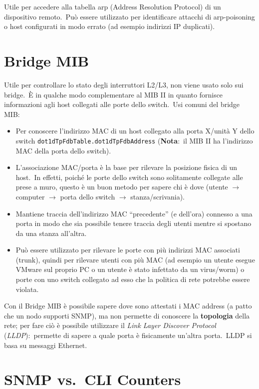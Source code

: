 Utile per accedere alla tabella arp (Address Resolution Protocol) di un dispositivo remoto.\
Può essere utilizzato per identificare attacchi di arp-poisoning o host configurati in modo errato (ad esempio indirizzi IP duplicati).

\section{Bridge MIB}

Utile per controllare lo stato degli interruttori L2/L3, non viene usato solo sui bridge.\
È in qualche modo complementare al MIB II in quanto fornisce informazioni agli host collegati alle porte dello switch.\
Usi comuni del bridge MIB:
\begin{itemize}
    \item Per conoscere l'indirizzo MAC di un host collegato alla porta X/unità Y dello switch \texttt{dot1dTpFdbTable.dot1dTpFdbAddress} (\textbf{Nota}:\ il MIB II ha l'indirizzo MAC della porta dello switch).
    \item L'associazione MAC/porta è la base per rilevare la posizione fisica di un host.\ In effetti, poiché le porte dello switch sono solitamente collegate alle prese a muro, questo è un buon metodo per sapere chi è dove (utente $\rightarrow$ computer $\rightarrow$ porta dello switch $\rightarrow$ stanza/scrivania).
    \item Mantiene traccia dell'indirizzo MAC ``precedente'' (e dell'ora) connesso a una porta in modo che sia possibile tenere traccia degli utenti mentre si spostano da una stanza all'altra.
    \item Può essere utilizzato per rilevare le porte con più indirizzi MAC associati (trunk), quindi per rilevare utenti con più MAC (ad esempio un utente esegue VMware sul proprio PC o un utente è stato infettato da un virus/worm) o porte con uno switch collegato ad esso che la politica di rete potrebbe essere violata.
\end{itemize}

\noindent Con il Bridge MIB è possibile sapere dove sono attestati i MAC address (a patto che un nodo supporti SNMP), ma non permette di conoscere la \textbf{topologia} della rete; per fare ciò è possibile utilizzare il \textit{Link Layer Discover Protocol} (\textit{LLDP}):\ permette di sapere a quale porta è fisicamente un'altra porta.\
LLDP si basa su messaggi Ethernet.\

\section{SNMP vs.\ CLI Counters}

